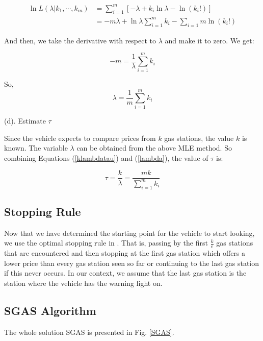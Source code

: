 \documentclass[conference]{IEEEtran}
\theoremstyle{definition}
\begin{document}
\begin{align*}
\ln L(\lambda|k_1, \cdots, k_m) &= \sum_{i=1}^{m}[-\lambda+k_{i}\ln \lambda - \ln(k_{i}!)] \\
                                &= -m \lambda + \ln \lambda \sum_{i=1}^{m}k_{i}-\sum_{i=1}{m}\ln (k_{i}!)
\end{align*}

And then, we take the derivative with respect to $\lambda$ and make it to zero. We get:

\[-m = \frac{1}{\lambda}\sum_{i=1}^{m}k_{i} \]

So,
\begin{equation} \label{lambda}
\lambda = \frac{1}{m} \sum_{i=1}^{m}k_{i}
\end{equation}

\noindent (d). Estimate   $\tau$

Since the vehicle expects to compare prices from $k$ gas stations, the value $k$ is known. The variable $\lambda$ can be obtained from the above MLE method. So combining Equations (\ref{klambdatau}) and (\ref{lambda}),  the value of $\tau$ is:

\begin{equation} \label{tau}
\tau = \frac{k}{\lambda} = \frac{mk}{\sum_{i=1}^{m}k_{i}}
\end{equation}

\subsection{Stopping Rule}
Now that we have determined the starting point for the vehicle to start looking, we use the optimal stopping rule in \cite{Gilbert1966}. That is, passing by the first $\frac {k}{e}$ gas stations that are encountered and then stopping at the first gas station which offers a lower price than every gas station seen so far or continuing to the last gas station if this never occurs. In our context, we assume that the last gas station is the station where the vehicle has the warning light on.

\subsection{SGAS Algorithm}

The whole solution SGAS is presented in Fig. \ref{SGAS}.
\end{document}
